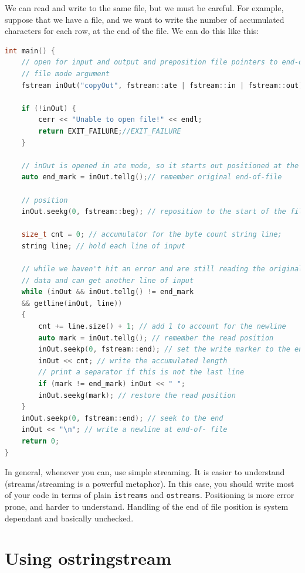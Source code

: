 We can read and write to the same file, but we must be careful. For example, suppose that we
have a file, and we want to write the number of accumulated characters for each row, at the
end of the file. We can do this like this:\\

\begin{lstlisting}[language=C++]
int main() {
    // open for input and output and preposition file pointers to end-of-file
    // file mode argument
    fstream inOut("copyOut", fstream::ate | fstream::in | fstream::out);

    if (!inOut) {
        cerr << "Unable to open file!" << endl;
        return EXIT_FAILURE;//EXIT_FAILURE
    }

    // inOut is opened in ate mode, so it starts out positioned at the end
    auto end_mark = inOut.tellg();// remember original end-of-file

    // position
    inOut.seekg(0, fstream::beg); // reposition to the start of the file

    size_t cnt = 0; // accumulator for the byte count string line;
    string line; // hold each line of input

    // while we haven't hit an error and are still reading the original
    // data and can get another line of input
    while (inOut && inOut.tellg() != end_mark
    && getline(inOut, line))
    {
        cnt += line.size() + 1; // add 1 to account for the newline
        auto mark = inOut.tellg(); // remember the read position
        inOut.seekp(0, fstream::end); // set the write marker to the end
        inOut << cnt; // write the accumulated length
        // print a separator if this is not the last line
        if (mark != end_mark) inOut << " ";
        inOut.seekg(mark); // restore the read position
    }
    inOut.seekp(0, fstream::end); // seek to the end
    inOut << "\n"; // write a newline at end-of- file
    return 0;
}
\end{lstlisting}

In general, whenever you can, use simple streaming. It is easier to understand (streams/streaming
is a powerful metaphor). In this case, you should write most of your code in terms of plain 
\texttt{istreams} and \texttt{ostreams}. Positioning is more error prone, and harder to understand.
Handling of the end of file position is system dependant and basically unchecked.

\section{Using ostringstream}

